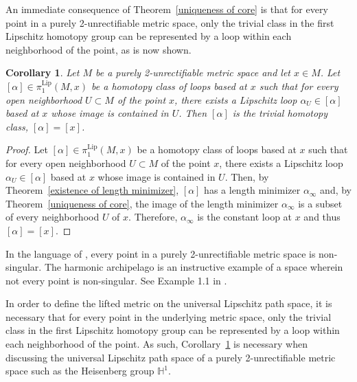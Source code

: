 \documentclass{article}
\newtheorem{corollary}[theorem]{Corollary}
\theoremstyle{definition}
\newtheorem{definition}[theorem]{Definition}
\theoremstyle{remark}
\def\H{\mathbb{H}}
\def\H{\mathbb{H}}
\newcommand{\pilip}[1]{\pi_{#1}^{\text{Lip}}}
\newcommand{\core}[1]{{#1}_\infty}
\begin{document}
An immediate consequence of Theorem~\ref{uniqueness of core} is that for every point in a purely 2-unrectifiable metric space, only the trivial class in the first Lipschitz homotopy group can be represented by a loop within each neighborhood of the point, as is now shown.




\begin{corollary}\label{heisenberg non-singular points}
Let $M$ be a purely 2-unrectifiable metric space and let $x\in M$. Let $[\alpha]\in\pilip{1}(M,x)$ be a homotopy class of loops based at $x$ such that for every open neighborhood $U\subset M$ of the point $x$, there exists a Lipschitz loop $\alpha_U\in[\alpha]$ based at $x$ whose image is contained in $U$. Then $[\alpha]$ is the trivial homotopy class, $[\alpha]=[x]$.
\end{corollary}

\begin{proof}
Let $[\alpha]\in\pilip{1}(M,x)$ be a homotopy class of loops based at $x$ such that for every open neighborhood $U\subset M$ of the point $x$, there exists a Lipschitz loop $\alpha_U\in[\alpha]$ based at $x$ whose image is contained in $U$. Then, by Theorem~\ref{existence of length minimizer}, $[\alpha]$ has a length minimizer $\core{\alpha}$ and, by Theorem~\ref{uniqueness of core}, the image of the length minimizer $\core{\alpha}$ is a subset of every neighborhood $U$ of $x$. Therefore, $\core{\alpha}$ is the constant loop at $x$ and thus $[\alpha]=[x]$.
\end{proof}


In the language of \cite{Bog}, every point in a purely 2-unrectifiable metric space is non-singular. The harmonic archipelago is an instructive example of a space wherein not every point is non-singular. See Example 1.1 in \cite{Bog}. 


In order to define the lifted metric on the universal Lipschitz path space, it is necessary that for every point in the underlying metric space, only the trivial class in the first Lipschitz homotopy group can be represented by a loop within each neighborhood of the point. As such, Corollary~\ref{heisenberg non-singular points} is necessary when discussing the universal Lipschitz path space of a purely 2-unrectifiable metric space such as the Heisenberg group $\H^1$.





{}

\end{document}
